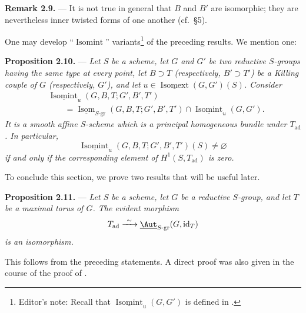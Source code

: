

\medskip\noindent\textbf{Remark 2.9.} ---
It is not true in general that \(B\) and \(B'\) are isomorphic;
they are nevertheless inner twisted forms of one another
(cf.\ \S5).

One may develop ``\(\operatorname{Isomint}\)'' variants\footnote{Editor's
note: Recall that
\(\underline{\operatorname{Isomint}}_u(G,G')\) is defined in .}
of the preceding results. We mention one:

\medskip\noindent\textbf{Proposition 2.10.} ---
{\itshape Let \(S\) be a scheme, let \(G\) and \(G'\) be two reductive
\(S\)-groups having the same type at every point, let \(B\supset T\)
(respectively, \(B'\supset T'\)) be a Killing couple of \(G\)
(respectively, \(G'\)), and let
\(u\in\underline{\operatorname{Isomext}}(G,G')(S)\). Consider}
\[
\begin{aligned}
  &\underline{\operatorname{Isomint}}_u
     (G,B,T;G',B',T')\\
  &\qquad =
  \underline{\operatorname{Isom}}_{S\text{-}\mathrm{gr}}
     (G,B,T;G',B',T')
  \cap
  \underline{\operatorname{Isomint}}_u(G,G').
\end{aligned}
\]
{\itshape It is a smooth affine \(S\)-scheme which is a principal
homogeneous bundle under \(T_{\mathrm{ad}}\). In particular,}
\[
  \underline{\operatorname{Isomint}}_u
    (G,B,T;G',B',T')(S)\ne\varnothing
\]
{\itshape if and only if the corresponding element of
\(H^1(S,T_{\mathrm{ad}})\) is zero.}

To conclude this section, we prove two results that will be useful
later.

\medskip\noindent\textbf{Proposition 2.11.} ---
{\itshape Let \(S\) be a scheme, let \(G\) be a reductive \(S\)-group,
and let \(T\) be a maximal torus of \(G\). The evident morphism}
\[
  T_{\mathrm{ad}}
  \xrightarrow{\ \sim\ }
  \underline{\Aut}_{S\text{-}\mathrm{gr}}(G,\operatorname{id}_T)
\]
{\itshape is an isomorphism.}

This follows from the preceding statements. A direct proof was also
given in the course of the proof of .

